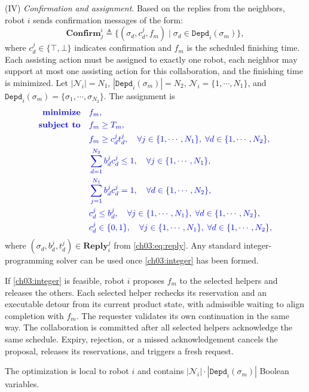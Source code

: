(IV) \emph{Confirmation and assignment}.
Based on the replies from the neighbors, robot $i$ sends confirmation messages
of the form:
\begin{equation}
\label{ch03:eq:confirm}
\textbf{Confirm}_j^i \triangleq
\{(\sigma_d,c_d^j,f_m) \mid
  \sigma_d \in \texttt{Depd}_i(\sigma_m)\},
\end{equation}
where $c_d^j \in \{\top,\bot\}$ indicates confirmation and $f_m$ is the
scheduled finishing time. Each assisting action must be assigned to exactly one
robot, each neighbor may support at most one assisting action for this
collaboration, and the finishing time is minimized. Let
$|\mathcal{N}_i|=N_1$, $|\texttt{Depd}_i(\sigma_m)|=N_2$,
$\mathcal{N}_i=\{1,\cdots,N_1\}$, and
$\texttt{Depd}_i(\sigma_m)=\{\sigma_1,\cdots,\sigma_{N_2}\}$. The assignment is
\begin{equation}
\color{blue}
\label{ch03:integer}
\begin{aligned}
\textbf{minimize} \quad & f_m, \\
\textbf{subject to} \quad
& f_m \ge T_m, \\
& f_m \ge c_d^j t_d^j,
  \quad \forall j \in \{1,\cdots,N_1\},\;
  \forall d \in \{1,\cdots,N_2\}, \\
& \sum_{d=1}^{N_2} b_d^j c_d^j \le 1,
  \quad \forall j \in \{1,\cdots,N_1\}, \\
& \sum_{j=1}^{N_1} b_d^j c_d^j = 1,
  \quad \forall d \in \{1,\cdots,N_2\}, \\
& c_d^j \le b_d^j,
  \quad \forall j\in\{1,\cdots,N_1\},\;\forall d\in\{1,\cdots,N_2\}, \\
& c_d^j \in \{0,1\},
  \quad \forall j \in \{1,\cdots,N_1\},\;
  \forall d \in \{1,\cdots,N_2\},
\end{aligned}
\end{equation}
where $(\sigma_d,b_d^j,t_d^j) \in \textbf{Reply}_i^j$ from
\eqref{ch03:eq:reply}. Any standard integer-programming solver can be used once
\eqref{ch03:integer} has been formed.
\begin{revision}
If \eqref{ch03:integer} is feasible, robot $i$ proposes $f_m$ to the selected
helpers and releases the others. Each selected helper rechecks its reservation
and an executable detour from its current product state, with admissible waiting
to align completion with $f_m$. The requester validates its own continuation
in the same way. The collaboration is committed after all selected helpers
acknowledge the same schedule. Expiry, rejection, or a missed acknowledgement
cancels the proposal, releases its reservations, and triggers a fresh request.
\end{revision} The optimization is local to robot
$i$ and contains
$|\mathcal{N}_i| \cdot |\texttt{Depd}_i(\sigma_m)|$ Boolean variables.

